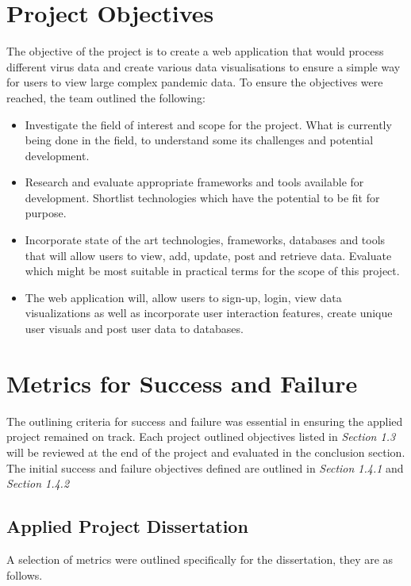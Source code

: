 \section{Project Objectives}
The objective of the project is to create a web application that would process different virus data and create various data visualisations to ensure a simple way for users to view large complex pandemic data. 
To ensure the objectives were reached, the team outlined the following:

\begin{itemize}
  \item Investigate the field of interest and scope for the project.
  What is currently being done in the field, to understand some its challenges and potential development.
  
  \item Research and evaluate appropriate frameworks and tools available for development.
  Shortlist technologies which have the potential to be fit for purpose.
  
  \item Incorporate state of the art technologies, frameworks, databases and tools that will allow users to view, add, update, post and retrieve data.
  Evaluate which might be most suitable in practical terms for the scope of this project.
  \item The web application will, allow users to sign-up, login, view data visualizations as well as incorporate user interaction features, create unique user visuals and post user data to databases.
\end{itemize}

\section{Metrics for Success and Failure}
The outlining criteria for success and failure was essential in ensuring the applied project remained on track.  Each project outlined objectives listed in \emph{Section 1.3} will be reviewed at the end of the project and evaluated in the conclusion section. The initial success and failure objectives defined are outlined in \emph{Section 1.4.1} and \emph{Section 1.4.2}

\vspace{5mm} %

\subsection{Applied Project Dissertation}
A selection of metrics were outlined specifically for the dissertation, they are as follows.

